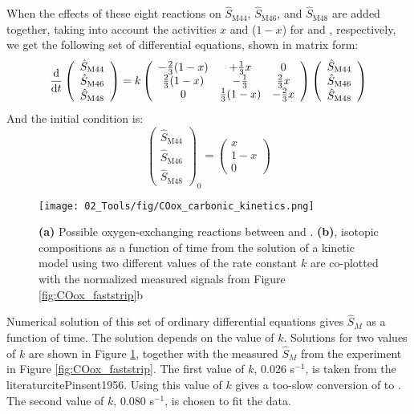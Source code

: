 When the effects of these eight reactions on $\hat{S}_\text{M44}$, $\hat{S}_\text{M46}$, and $\hat{S}_\text{M48}$ are added together, taking into account the activities $x$ and ($1-x$) for  and , respectively, we get the following set of differential equations, shown in matrix form:
\begin{equation}
\frac{\mathrm{d}}{\mathrm{d} t} \left( \begin{array}{c}  \hat{S}_\text{M44} \\ \hat{S}_\text{M46}\\ \hat{S}_\text{M48} 
\end{array}  \right) = k \left( \begin{array}{c c c}   -\frac{2}{3}(1-x) & + \frac{1}{3}x & 0 \\  \frac{2}{3}(1-x) & -\frac{1}{3} & \frac{2}{3}x \\  0 & \frac{1}{3}(1-x) & -\frac{2}{3}x
\end{array}  \right) \left(\begin{array}{c}  \hat{S}_\text{M44} \\ \hat{S}_\text{M46}\\ \hat{S}_\text{M48} 
\end{array}  \right)
\end{equation}
And the initial condition is:
\begin{equation}
\left(\begin{array}{c}  \hat{S}_\text{M44} \\ \hat{S}_\text{M46}\\ \hat{S}_\text{M48} 
\end{array}  \right)_0 = \left(\begin{array}{c}  x \\ 1-x \\ 0 
\end{array}  \right)
\end{equation}
\begin{figure}[b!]
	\centering
	\texttt{[image: 02\_Tools/fig/COox\_carbonic\_kinetics.png]}
	\caption{\textbf{(a)} Possible oxygen-exchanging reactions between  and . \textbf{(b)},  isotopic compositions as a function of time from the solution of a kinetic model using two different values of the rate constant $k$ are co-plotted with the normalized measured  signals from Figure \ref{fig:COox_faststrip}b}
	\label{fig:carbonic_kinetics}
\end{figure}
Numerical solution of this set of ordinary differential equations gives $\hat{S}_M$ as a function of time. The solution depends on the value of $k$. Solutions for two values of $k$ are shown in Figure \ref{fig:carbonic_kinetics}, together with the measured $\hat{S}_M$ from the experiment in Figure \ref{fig:COox_faststrip}. The first value of $k$, 0.026 s$^{-1}$, is taken from the literaturcite{Pinsent1956}. Using this value of $k$ gives a too-slow conversion of  to . The second value of $k$, 0.080 s$^{-1}$, is chosen to fit the data. 

